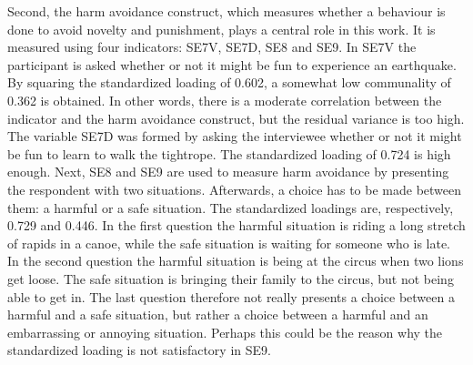 \documentclass[11pt]{article}
\begin{document}

Second, the harm avoidance construct, which measures whether a behaviour is done
to avoid novelty and punishment, plays a central role in this work. It is
measured using four indicators: SE7V, SE7D, SE8 and SE9. In SE7V the participant
is asked whether or not it might be fun to experience an earthquake. By squaring
the standardized loading of 0.602, a somewhat low communality of 0.362 is
obtained. In other words, there is a moderate correlation between the indicator
and the harm avoidance construct, but the residual variance is too high. The
variable SE7D was formed by asking the interviewee whether or not it might be
fun to learn to walk the tightrope. The standardized loading of 0.724 is high enough.
Next, SE8 and SE9 are used to measure harm avoidance by presenting the respondent
with two situations. Afterwards, a choice has to be made between them: a harmful
or a safe situation. The standardized loadings are, respectively, 0.729 and
0.446. In the first question the harmful situation is riding a long stretch of
rapids in a canoe, while the safe situation is waiting for someone who is late.
In the second question the harmful situation is being at the circus when two
lions get loose. The safe situation is bringing their family to the circus, but
not being able to get in. The last question therefore not really presents a
choice between a harmful and a safe situation, but rather a choice between a
harmful and an embarrassing or annoying situation. Perhaps this could be the
reason why the standardized loading is not satisfactory in SE9.

\end{document}
